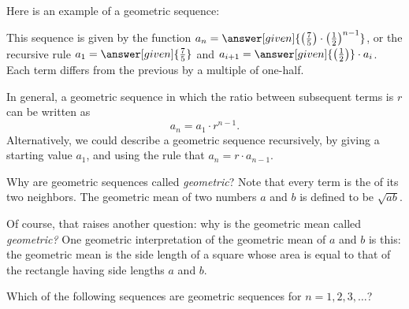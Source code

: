 \documentclass{ximera}
\begin{document}
\begin{example}
  Here is an example of a geometric sequence:
  \begin{image}
  \end{image}
  This sequence is given by the function $a_n=\answer[given]{\left(\frac{7}{5}\right)\cdot
    \left(\frac{1}{2}\right)^{n-1}}$, or the recursive rule $a_1 = \answer[given]{\frac{7}{5}}$ and
  $a_{i+1} = \answer[given]{\left(\frac{1}{2}\right)}\cdot a_i$. Each term differs from the
  previous by a multiple of one-half.
\end{example}



In general, a geometric sequence in which the ratio between
subsequent terms is $r$ can be written as
\[
a_n = a_1 \cdot r^{n-1}.
\]
Alternatively, we could describe a geometric sequence
recursively, by giving a starting value $a_1$, and using the rule that
$a_{n} = r \cdot a_{n-1}$.

\begin{remark}
Why are geometric sequences called \textit{geometric}?  Note that
every term is the  of its two neighbors.  The
geometric mean of two numbers $a$ and $b$ is defined to be
$\sqrt{ab}$.

Of course, that raises another question: why is the geometric mean
called \textit{geometric?}  One geometric interpretation of the
geometric mean of $a$ and $b$ is this: the geometric mean is the side
length of a square whose area is equal to that of the rectangle having
side lengths $a$ and $b$.
\end{remark}

\begin{question}
  Which of the following sequences are geometric sequences for
  $n=1,2,3,\dots$?
  \begin{selectAll}
  \end{selectAll}
\end{question}
\end{document}
